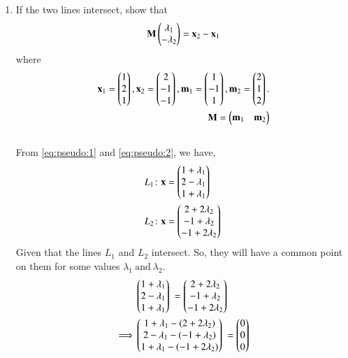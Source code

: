 \documentclass[journal,12pt,twocolumn]{IEEEtran}
\renewcommand\thesection{\arabic{section}}
\begin{document}
\begin{enumerate}[label=\thesection.\arabic*.,ref=\thesection.\theenumi]

\item If the two lines intersect, show that 
\begin{align}
\mathbf{M}\begin{pmatrix}\lambda_1 \\ -\lambda_2\end{pmatrix} = \mathbf{x}_2 - \mathbf{x}_1
\label{eq:pseudo_intersect}
\end{align}
%
where 
\begin{align}
\label{eq:pseudo_xm}
\mathbf{x}_1 = \begin{pmatrix}1\\2\\1\end{pmatrix},
\mathbf{x}_2 = \begin{pmatrix}2\\-1\\-1\end{pmatrix},
\mathbf{m}_1 = \begin{pmatrix}1\\-1\\1\end{pmatrix},
\mathbf{m}_2 = \begin{pmatrix}2\\1\\2\end{pmatrix}.
\\
\mathbf{M} =\begin{pmatrix}\mathbf{m}_1 & \mathbf{m}_2\end{pmatrix}
\label{eq:pseudo_rect}
\end{align}
\solution\\ From \eqref{eq:pseudo:1} and \eqref{eq:pseudo:2}, we have,
\begin{align*}
    L_1\colon& \mathbf{x}=\begin{pmatrix}1+\lambda_1\\2-\lambda_1\\1+\lambda_1\end{pmatrix}\ \\
    L_2\colon& \mathbf{x}=\begin{pmatrix}2+2\lambda_2\\-1+\lambda_2\\-1+2\lambda_2\end{pmatrix}\ \\
\end{align*}
Given that the lines $L_1$ and $L_2$ intersect. So, they will have a common point on them for some values $\lambda_1~\text{and}~\lambda_2$.
\begin{align*}
& \myvec{1+\lambda_1\\2-\lambda_1\\1+\lambda_1}\ =\myvec{2+2\lambda_2\\-1+\lambda_2\\-1+2\lambda_2}\ \\
\implies & \myvec{1+\lambda_1-(2+2\lambda_2)\\2-\lambda_1-(-1+\lambda_2)\\1+\lambda_1-(-1+2\lambda_2)}\ = \myvec{0\\0\\0}\ \\

\end{align*}
\end{enumerate}
\end{document}
